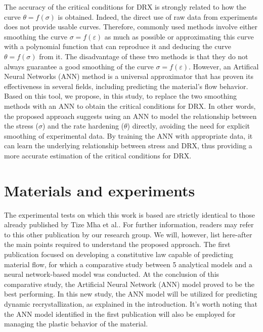 \documentclass[metals,article,submit,pdftex,moreauthors]{Definitions/mdpi}
\makeatletter
\DeclareRobustCommand{\eal}{et al.\@\xspace}
\makeatother
\begin{document}
The accuracy of the critical conditions for DRX is strongly related to how the curve $\theta=f(\sigma)$ is obtained. Indeed, the direct use of raw data from experiments does not provide usable curves. Therefore, commonly used methods involve either smoothing the curve $\sigma=f(\varepsilon)$  as much as possible or approximating this curve with a polynomial function that can reproduce it and deducing the curve $\theta=f(\sigma)$ from it. The disadvantage of these two methods is that they do not always guarantee a good smoothing of the curve $\sigma=f(\varepsilon)$. However, an Artifical Neural Networks (ANN) method is a universal approximator that has proven its effectiveness in several fields, including predicting the material's flow behavior. Based on this tool, we propose, in this study, to replace the two smoothing methods with an ANN to obtain the critical conditions for DRX. In other words, the proposed approach suggests using an ANN to model the relationship between the stress ($\sigma$) and the rate hardening ($\theta$) directly, avoiding the need for explicit smoothing of experimental data. By training the ANN with appropriate data, it can learn the underlying relationship between stress and DRX, thus providing a more accurate estimation of the critical conditions for DRX.

\section{Materials and experiments\label{sec:MaterialsExperiments}}
The experimental tests on which this work is based are strictly identical to those already published by Tize Mha \eal \cite{TizeMha-2023}.
For further information, readers may refer to this other publication by our research group. We will, however, list here-after the main points required to understand the proposed approach. The first publication focused on developing a constitutive law capable of predicting material flow, for which a comparative study between 5 analytical models and a neural network-based model was conducted. At the conclusion of this comparative study, the Artificial Neural Network (ANN) model proved to be the best performing. In this new study, the ANN model will be utilized for predicting dynamic recrystallization, as explained in the introduction. It's worth noting that the ANN model identified in the first publication will also be employed for managing the plastic behavior of the material.
\end{document}
